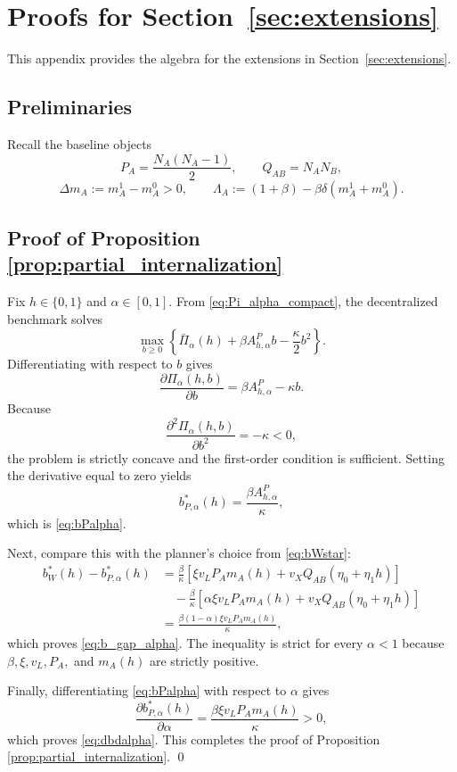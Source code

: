 \section{Proofs for Section~\ref{sec:extensions}}

This appendix provides the algebra for the extensions in Section~\ref{sec:extensions}.

\subsection{Preliminaries}

Recall the baseline objects
\[
P_A=\frac{N_A(N_A-1)}{2},
\qquad
Q_{AB}=N_A N_B,
\]
\[
\Delta m_A:=m_A^1-m_A^0>0,
\qquad
\Lambda_A:=(1+\beta)-\beta\delta(m_A^1+m_A^0).
\]

\subsection{Proof of Proposition \ref{prop:partial_internalization}}

Fix $h\in\{0,1\}$ and $\alpha\in[0,1]$. From \eqref{eq:Pi_alpha_compact}, the decentralized benchmark solves
\[
\max_{b\ge 0}
\left\{
\bar\Pi_{\alpha}(h)+\beta A_{h,\alpha}^P b-\frac{\kappa}{2}b^2
\right\}.
\]
Differentiating with respect to $b$ gives
\[
\frac{\partial \Pi_{\alpha}(h,b)}{\partial b}
=
\beta A_{h,\alpha}^P-\kappa b.
\]
Because
\[
\frac{\partial^2 \Pi_{\alpha}(h,b)}{\partial b^2}=-\kappa<0,
\]
the problem is strictly concave and the first-order condition is sufficient. Setting the derivative equal to zero yields
\[
b_{P,\alpha}^*(h)=\frac{\beta A_{h,\alpha}^P}{\kappa},
\]
which is \eqref{eq:bPalpha}.

Next, compare this with the planner's choice from \eqref{eq:bWstar}:
\begin{align}
b_W^*(h)-b_{P,\alpha}^*(h)
&=
\frac{\beta}{\kappa}
\left[
\xi v_LP_Am_A(h)+v_XQ_{AB}(\eta_0+\eta_1 h)
\right]
\nonumber\\
&\quad
-\frac{\beta}{\kappa}
\left[
\alpha\xi v_LP_Am_A(h)+v_XQ_{AB}(\eta_0+\eta_1 h)
\right]
\nonumber\\
&=
\frac{\beta(1-\alpha)\xi v_LP_Am_A(h)}{\kappa},
\label{eq:app7_gap_alpha_raw}
\end{align}
which proves \eqref{eq:b_gap_alpha}. The inequality is strict for every $\alpha<1$ because $\beta,\xi,v_L,P_A,$ and $m_A(h)$ are strictly positive.

Finally, differentiating \eqref{eq:bPalpha} with respect to $\alpha$ gives
\[
\frac{\partial b_{P,\alpha}^*(h)}{\partial \alpha}
=
\frac{\beta\xi v_LP_Am_A(h)}{\kappa}
>0,
\]
which proves \eqref{eq:dbdalpha}. This completes the proof of Proposition \ref{prop:partial_internalization}.
\qed

